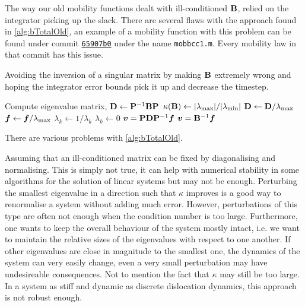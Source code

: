The way our old mobility functions dealt with ill-conditioned $\mathbf{B}$, relied on the integrator picking up the slack. There are several flaws with the approach found in \cref{alg:bTotalOld}, an example of a mobility function with this problem can be found under commit \href{https://github.com/TarletonGroup/EasyDD/blob/65907b022d1fe408fc1b2e5c5ca2bd1797ccae04/mobbcc1.m#L68}{\texttt{65907b0}} under the name \texttt{mobbcc1.m}. Every mobility law in that commit has this issue.
\begin{algorithm}
    \caption[Bad way of avoiding drag matrix inversion singularity.]{Avoiding the inversion of a singular matrix by making $\mathbf{B}$ extremely wrong and hoping the integrator error bounds pick it up and decrease the timestep.}
    \label{alg:bTotalOld}
    \begin{algorithmic}
        \State Compute eigenvalue matrix, $\mathbf{D} \gets \mathbf{P}^{-1} \mathbf{B} \mathbf{P}$
        \State $\kappa(\mathbf{B}) \gets \lvert \lambda_{\textrm{max}} \rvert/ \lvert \lambda_{\textrm{min}} \rvert$
        \State $\mathbf{D} \gets \mathbf{D} / \lambda_{\textrm{max}}$
        \State $\vec{f} \gets \vec{f} / \lambda_{\rvar{max}}$
        \State $\lambda_k \gets 1/\lambda_k$
        \Else
        \State $\lambda_k \gets 0$
        \EndIf
        \EndFor
        \State $\vec{v} = \mtx{P} \mtx{D} \mtx{P}^{-1} \vec{f}$
        \Else
        \State $\vec{v} = \mtx{B}^{-1} \vec{f}$
        \EndIf
    \end{algorithmic}
\end{algorithm}
There are various problems with \cref{alg:bTotalOld}.

Assuming that an ill-conditioned matrix can be fixed by diagonalising and normalising. This is simply not true, it can help with numerical stability in some algorithms for the solution of linear systems but may not be enough. Perturbing the smallest eigenvalue in a direction such that $\kappa$ improves is a good way to renormalise a system without adding much error. However, perturbations of this type are often not enough when the condition number is too large. Furthermore, one wants to keep the overall behaviour of the system mostly intact, i.e. we want to maintain the relative sizes of the eigenvalues with respect to one another. If other eigenvalues are close in magnitude to the smallest one, the dynamics of the system can very easily change, even a very small perturbation may have undesireable consequences. Not to mention the fact that $\kappa$ may still be too large. In a system as stiff and dynamic as discrete dislocation dynamics, this approach is not robust enough.


